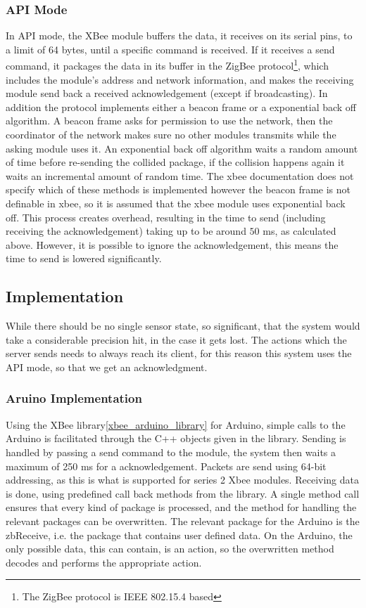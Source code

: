 \subsubsection{API Mode}
In API mode, the XBee module buffers the data, it receives on its serial pins, to a limit of 64 bytes, until a specific command is received. If it receives a send command, it packages the data in its buffer in the ZigBee protocol\footnote{The ZigBee protocol is IEEE 802.15.4 based}, which includes the module's address and network information, and makes the receiving module send back a received acknowledgement (except if broadcasting). In addition the protocol implements either a beacon frame or a exponential back off algorithm. A beacon frame asks for permission to use the network, then the coordinator of the network makes sure no other modules transmits while the asking module uses it. An exponential back off algorithm waits a random amount of time before re-sending the collided package, if the collision happens again it waits an incremental amount of random time. The xbee documentation does not specify which of these methods is implemented however the beacon frame is not definable in xbee, so it is assumed that the xbee module uses exponential back off. This process creates overhead, resulting in the time to send (including receiving the acknowledgement) taking up to be around $50$ ms, as calculated above. However, it is possible to ignore the acknowledgement, this means the time to send is lowered significantly.

\subsection{Implementation}
While there should be no single sensor state, so significant, that the system would take a considerable precision hit, in the case it gets lost. The actions which the server sends needs to always reach its client, for this reason this system uses the API mode, so that we get an acknowledgment.

\subsubsection{Aruino Implementation}
Using the XBee library\cref{xbee_arduino_library} for Arduino, simple calls to the Arduino is facilitated through the C++ objects given in the library. Sending is handled by passing a send command  to the module, the system then waits a maximum of 250 ms for a acknowledgement. Packets are send using 64-bit addressing, as this is what is supported for series 2 Xbee modules.
Receiving data is done, using predefined call back methods from the library. A single method call ensures that every kind of package is processed, and the method for handling the relevant packages can be overwritten. The relevant package for the Arduino is the zbReceive, i.e. the package that contains user defined data. On the Arduino, the only possible data, this can contain, is an action, so the overwritten method decodes and performs the appropriate action.
